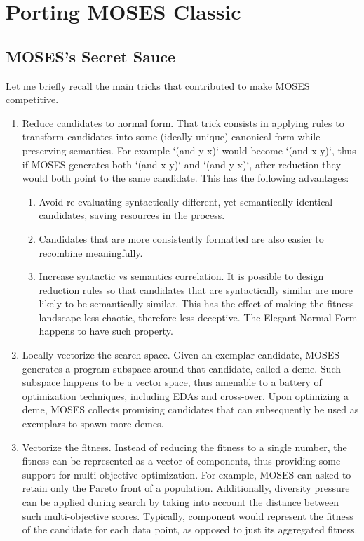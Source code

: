 \documentclass[]{report}
\begin{document}
\chapter{Porting MOSES Classic}

\section{MOSES's Secret Sauce}

Let me briefly recall the main tricks that contributed to make MOSES
competitive.

\begin{enumerate}
\item Reduce candidates to normal form.  That trick consists in applying
rules to transform candidates into some (ideally unique) canonical
form while preserving semantics.  For example `(and y x)` would become
`(and x y)`, thus if MOSES generates both `(and x y)` and `(and y x)`,
after reduction they would both point to the same candidate.  This has
the following advantages:
\begin{enumerate}
\item Avoid re-evaluating syntactically different, yet semantically
identical candidates, saving resources in the process.
\item Candidates that are more consistently
formatted are also easier to recombine meaningfully.
\item Increase syntactic vs semantics correlation.  It is possible
to design reduction rules so that candidates that are syntactically
similar are more likely to be semantically similar.  This has the
effect of making the fitness landscape less chaotic, therefore less
deceptive.  The Elegant Normal Form happens to have such property.
\end{enumerate}
\item Locally vectorize the search space.  Given an exemplar candidate,
MOSES generates a program subspace around that candidate, called a
deme.  Such subspace happens to be a vector space, thus amenable to a
battery of optimization techniques, including EDAs and cross-over.
Upon optimizing a deme, MOSES collects promising candidates that can
subsequently be used as exemplars to spawn more demes.
\item Vectorize the fitness.  Instead of reducing the fitness to a single
number, the fitness can be represented as a vector of components, thus
providing some support for multi-objective optimization.  For example,
MOSES can asked to retain only the Pareto front of a population.
Additionally, diversity pressure can be applied during search by
taking into account the distance between such multi-objective scores.
Typically, component would represent the fitness of the candidate for
each data point, as opposed to just its aggregated fitness.
\end{enumerate}
\end{document}
